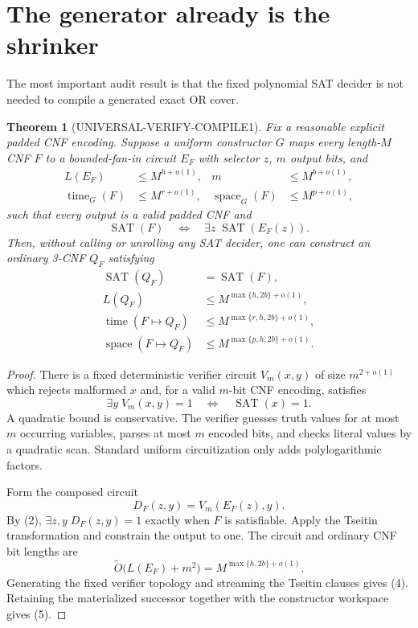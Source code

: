 \documentclass[11pt]{article}
\newcommand{\SAT}{\operatorname{SAT}}
\newtheorem{theorem}{Theorem}
\begin{document}
\section{The generator already is the shrinker}

The most important audit result is that the fixed polynomial SAT decider is
not needed to compile a generated exact OR cover.

\begin{theorem}[UNIVERSAL-VERIFY-COMPILE1]
Fix a reasonable explicit padded CNF encoding.  Suppose a uniform constructor
$G$ maps every length-$M$ CNF $F$ to a bounded-fan-in circuit $E_F$ with
selector $z$, $m$ output bits, and
\begin{align*}
 L(E_F)&\le M^{h+o(1)}, & m&\le M^{b+o(1)},\\
 \operatorname{time}_G(F)&\le M^{r+o(1)}, &
 \operatorname{space}_G(F)&\le M^{p+o(1)},
\end{align*}
such that every output is a valid padded CNF and
\[
 \SAT(F)\quad\Longleftrightarrow\quad
 \exists z\;\SAT(E_F(z)).                              \tag{2}
\]
Then, without calling or unrolling any SAT decider, one can construct an
ordinary 3-CNF $Q_F$ satisfying
\begin{align*}
 \SAT(Q_F)&=\SAT(F),\\
 L(Q_F)&\le M^{\max\{h,2b\}+o(1)},                     \tag{3}\\
 \operatorname{time}(F\mapsto Q_F)
   &\le M^{\max\{r,h,2b\}+o(1)},                       \tag{4}\\
 \operatorname{space}(F\mapsto Q_F)
   &\le M^{\max\{p,h,2b\}+o(1)}.                      \tag{5}
\end{align*}
\end{theorem}

\begin{proof}
There is a fixed deterministic verifier circuit $V_m(x,y)$ of size
$m^{2+o(1)}$ which rejects malformed $x$ and, for a valid $m$-bit CNF
encoding, satisfies
\[
 \exists y\;V_m(x,y)=1\quad\Longleftrightarrow\quad\SAT(x)=1.
\]
A quadratic bound is conservative.  The verifier guesses truth values for at
most $m$ occurring variables, parses at most $m$ encoded bits, and checks
literal values by a quadratic scan.  Standard uniform circuitization only
adds polylogarithmic factors.

Form the composed circuit
\[
 D_F(z,y)=V_m(E_F(z),y).
\]
By (2), $\exists z,y\;D_F(z,y)=1$ exactly when $F$ is satisfiable.  Apply the
Tseitin transformation and constrain the output to one.  The circuit and
ordinary CNF bit lengths are
\[
 \widetilde O\bigl(L(E_F)+m^2\bigr)
 =M^{\max\{h,2b\}+o(1)}.
\]
Generating the fixed verifier topology and streaming the Tseitin clauses
gives (4).  Retaining the materialized successor together with the
constructor workspace gives (5).
\end{proof}
\end{document}
